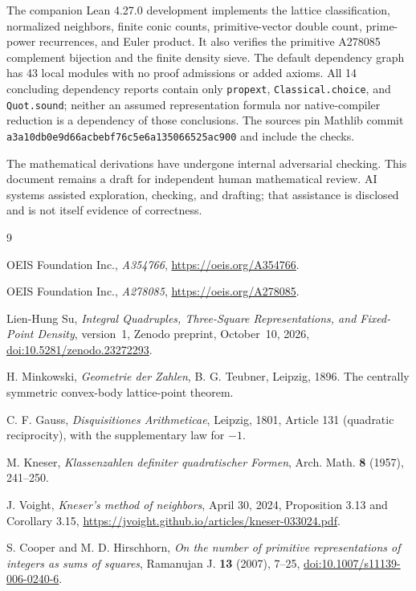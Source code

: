 \documentclass[11pt]{article}
\theoremstyle{remark}
\begin{document}
The companion Lean 4.27.0 development implements the lattice
classification, normalized neighbors, finite conic counts, primitive-vector
double count, prime-power recurrences, and Euler product. It also verifies
the primitive A278085 complement bijection and the finite density sieve.
The default dependency graph has 43 local modules with no proof admissions
or added axioms. All 14 concluding dependency reports contain only
\texttt{propext}, \texttt{Classical.choice}, and \texttt{Quot.sound}; neither
an assumed representation formula nor native-compiler reduction is a
dependency of those conclusions. The sources pin Mathlib commit
\texttt{a3a10db0e9d66acbebf76c5e6a135066525ac900} and include the checks.

The mathematical derivations have undergone internal adversarial checking.
This document remains a draft for independent human mathematical review.
AI systems assisted exploration, checking, and drafting; that assistance
is disclosed and is not itself evidence of correctness.

\begin{thebibliography}{9}

OEIS Foundation Inc., \emph{A354766},
\url{https://oeis.org/A354766}.

OEIS Foundation Inc., \emph{A278085},
\url{https://oeis.org/A278085}.

Lien-Hung Su,
\emph{Integral Quadruples, Three-Square Representations, and Fixed-Point Density},
version~1, Zenodo preprint, October~10, 2026,
\href{https://doi.org/10.5281/zenodo.23272293}{doi:10.5281/zenodo.23272293}.

H. Minkowski, \emph{Geometrie der Zahlen}, B. G. Teubner, Leipzig, 1896.
The centrally symmetric convex-body lattice-point theorem.

C. F. Gauss, \emph{Disquisitiones Arithmeticae}, Leipzig, 1801,
Article 131 (quadratic reciprocity), with the supplementary law for $-1$.

M. Kneser, \emph{Klassenzahlen definiter quadratischer Formen},
Arch. Math. \textbf{8} (1957), 241--250.

J. Voight, \emph{Kneser's method of neighbors}, April 30, 2024,
Proposition 3.13 and Corollary 3.15,
\url{https://jvoight.github.io/articles/kneser-033024.pdf}.

S. Cooper and M. D. Hirschhorn,
\emph{On the number of primitive representations of integers as sums of squares},
Ramanujan J. \textbf{13} (2007), 7--25,
\href{https://doi.org/10.1007/s11139-006-0240-6}{doi:10.1007/s11139-006-0240-6}.

\end{thebibliography}
\end{document}
